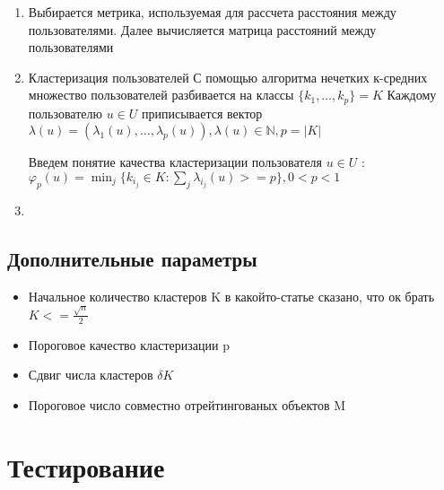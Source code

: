 \documentclass[12pt]{article} %
\begin{document}
\begin{enumerate} 

\item Выбирается метрика, используемая для рассчета расстояния между пользователями. Далее вычисляется матрица расстояний между пользователями


\item Кластеризация пользователей
С помощью алгоритма нечетких к-средних множество пользователей разбивается на классы $\{k_{1},\dots,k_{p}\}=K$
Каждому пользователю $u \in U$ приписывается вектор $\lambda(u)=(\lambda_{1}(u),\dots,\lambda_{p}(u)), \lambda(u)\in\mathbb{N}, p=|K|$

Введем понятие качества кластеризации пользователя $u \in U$ :
$\varphi_{p}(u) = \min_{j} \{k_{i_{j}} \in K: \sum_{j} \lambda_{i_{j}}(u) >= p\}, 0 < p < 1$ 

\item 

\end{enumerate}

\subsection{Дополнительные параметры}

\begin{itemize}

\item Начальное количество кластеров K
в какойто-статье сказано, что ок брать $K <= \frac{\sqrt{n}}{2} $
\item Пороговое качество кластеризации p
\item Сдвиг числа кластеров $\delta K$
\item Пороговое число совместно отрейтингованых объектов M

\end{itemize}

\section{Тестирование}
\end{document}
